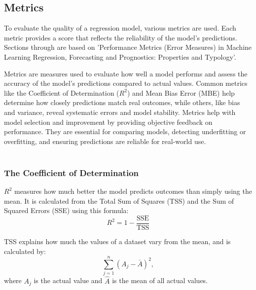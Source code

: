 \subsection{Metrics}
To evaluate the quality of a regression model, various metrics are used. Each metric provides a score that reflects the reliability of the model's predictions. Sections through are based on 'Performance Metrics (Error Measures) in Machine Learning Regression, Forecasting and Prognostics: Properties and Typology'\cite{metrics}. \newline

	\noindent Metrics are measures used to evaluate how well a model performs and assess the accuracy of the model’s predictions compared to actual values. Common metrics like the Coefficient of Determination ($R^{2}$) and Mean Bias Error (MBE) help determine how closely predictions match real outcomes, while others, like bias and variance, reveal systematic errors and model stability. Metrics help with model selection and improvement by providing objective feedback on performance. They are essential for comparing models, detecting underfitting or overfitting, and ensuring predictions are reliable for real-world use.
\\\\

\subsubsection{The Coefficient of Determination}
$R^2$ measures how much better the model predicts outcomes than simply using the mean. It is calculated from the Total Sum of Squares (TSS) and the Sum of Squared Errors (SSE) using this formula: 
\begin{equation}
R^2=1-\frac{\text{SSE}}{\text{TSS}}
\end{equation}

\noindent TSS explains how much the values of a dataset vary from the mean, and is calculated by: 
\begin{equation}
\sum_{j=1}^{n}(A_j - \bar{A})^2,
\end{equation}
where $A_j$ is the actual value and $\hat{A}$ is the mean of all actual values.
\\\\

